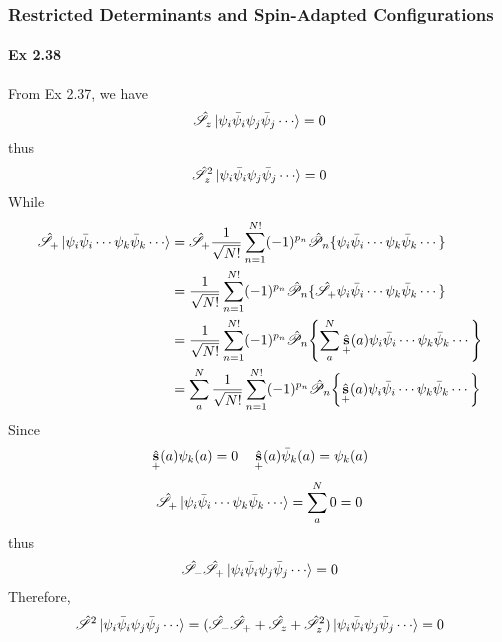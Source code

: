 \documentclass[a4paper]{article}
\DeclareMathOperator{\hs}{\hat{\vb{s}}}
\newcommand{\hsP}{\hat{\mathscr{P}}}
\newcommand{\hsS}{\hat{\mathscr{S}}}
\newcommand{\ex}[1]{\paragraph{Ex #1}}
\numberwithin{equation}{subsection}
\begin{document}
\subsubsection{Restricted Determinants and Spin-Adapted Configurations}
\ex{2.38}
From Ex 2.37, we have
\begin{equation}\label{key}
\hsS_z \ket{\psi_i\bar{\psi}_i\psi_j\bar{\psi}_j\cdots} = 0
\end{equation}
thus
\begin{equation}\label{key}
\hsS_z^2 \ket{\psi_i\bar{\psi}_i\psi_j\bar{\psi}_j\cdots} = 0
\end{equation}
While
\begin{align}
\hsS_+ \ket{\psi_i\bar{\psi}_i\cdots\psi_k\bar{\psi}_k\cdots} &= \hsS_+ \dfrac{1}{\sqrt{N!}}\sum_{n=1}^{N!}(-1)^{p_n} \hsP_n\{\psi_i\bar{\psi}_i\cdots\psi_k\bar{\psi}_k\cdots\} \notag\\
&= \dfrac{1}{\sqrt{N!}}\sum_{n=1}^{N!}(-1)^{p_n} \hsP_n\{\hsS_+ \psi_i\bar{\psi}_i\cdots\psi_k\bar{\psi}_k\cdots\}  \notag\\\
&= \dfrac{1}{\sqrt{N!}}\sum_{n=1}^{N!}(-1)^{p_n} \hsP_n\qty{\sum_a^N \hs_+(a) \psi_i\bar{\psi}_i\cdots\psi_k\bar{\psi}_k\cdots}  \notag\\
&= \sum_a^N \dfrac{1}{\sqrt{N!}}\sum_{n=1}^{N!}(-1)^{p_n} \hsP_n\qty{ \hs_+(a) \psi_i\bar{\psi}_i\cdots\psi_k\bar{\psi}_k\cdots}  
\end{align}
Since 
\begin{equation}\label{key}
\hs_+(a)\psi_k(a) = 0 \quad \hs_+(a)\bar{\psi}_k(a) = \psi_k(a)
\end{equation}
\begin{align}
\hsS_+ \ket{\psi_i\bar{\psi}_i\cdots\psi_k\bar{\psi}_k\cdots} 
= \sum_a^N 0 = 0
\end{align}
thus
\begin{equation}\label{key}
\hsS_-\hsS_+ \ket{\psi_i\bar{\psi}_i\psi_j\bar{\psi}_j\cdots} 
= 0
\end{equation}
Therefore,
\begin{equation}\label{key}
\hsS^2 \ket{\psi_i\bar{\psi}_i\psi_j\bar{\psi}_j\cdots}  = (\hsS_-\hsS_+ + \hsS_z + \hsS_z^2)\ket{\psi_i\bar{\psi}_i\psi_j\bar{\psi}_j\cdots} = 0
\end{equation}
\end{document}
